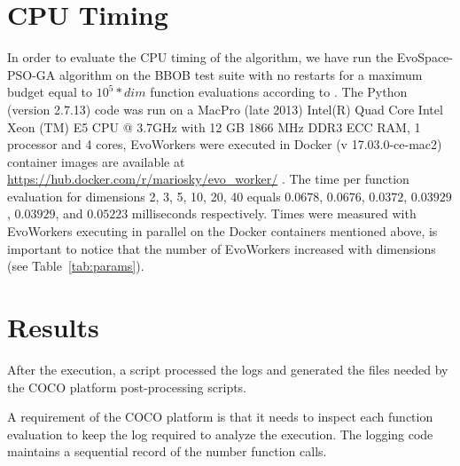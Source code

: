 \documentclass[sigconf]{acmart}
\begin{document}
%
\section{CPU Timing}
In order to evaluate the CPU timing of the algorithm, we have run the EvoSpace-PSO-GA algorithm 
on the  BBOB test suite \cite{hansen2009fun} with no restarts for a maximum budget 
equal to  $10^5*dim$ function evaluations according to \cite{hansen2016exp}. 
The Python (version 2.7.13) code was run on a MacPro (late 2013) Intel(R) Quad Core 
Intel Xeon (TM) E5 CPU @ 3.7GHz with 12 GB 1866 MHz DDR3 ECC RAM, 1 processor and 4 cores, 
EvoWorkers were executed in Docker (v 17.03.0-ce-mac2) container images are available at
\url{https://hub.docker.com/r/mariosky/evo_worker/} . 
The time per function evaluation for dimensions 2, 3, 5, 10, 20, 40 equals $0.0678$, $0.0676$,
$0.0372$, $0.03929$, $0.03929$, and $0.05223$  milliseconds respectively. 
Times were measured with EvoWorkers executing in parallel on the Docker containers
mentioned above, is important to notice that the number of EvoWorkers increased 
with dimensions (see Table~\ref{tab:params}). 



\section{Results}

After the  execution, a script processed the logs and 
generated the files needed by the COCO platform 
\cite{hansen2016cocoplat}  post-processing scripts. 

A requirement of the COCO platform is that it needs 
to inspect each function evaluation to keep the log required 
to analyze the execution. The logging code maintains 
a sequential record of the number function calls. 
\end{document}
